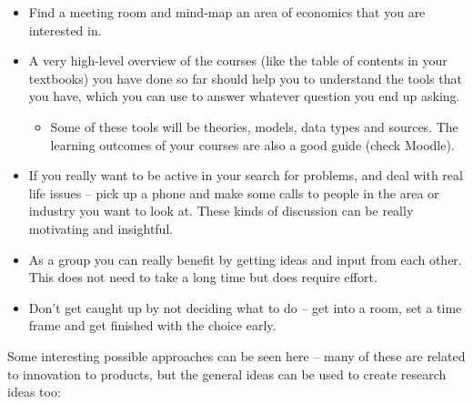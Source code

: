 \documentclass[
]{book}
\providecommand{\tightlist}{%
  \setlength{\itemsep}{0pt}\setlength{\parskip}{0pt}}
\begin{document}
\begin{itemize}
\item
  Find a meeting room and mind-map an area of economics that you are
  interested in.
\item
  A very high-level overview of the courses (like the table of
  contents in your textbooks) you have done so far should help you to
  understand the tools that you have, which you can use to answer
  whatever question you end up asking.

  \begin{itemize}
  \tightlist
  \item
    Some of these tools will be theories, models, data types and
    sources. The learning outcomes of your courses are also a good
    guide (check Moodle).
  \end{itemize}
\item
  If you really want to be active in your search for problems, and
  deal with real life issues -- pick up a phone and make some calls to
  people in the area or industry you want to look at. These kinds of
  discussion can be really motivating and insightful.
\item
  As a group you can really benefit by getting ideas and input from
  each other. This does not need to take a long time but does require
  effort.
\item
  Don't get caught up by not deciding what to do -- get into a room,
  set a time frame and get finished with the choice early.
\end{itemize}

Some interesting possible approaches can be seen here -- many of these
are related to innovation to products, but the general ideas can be used
to create research ideas too:
\end{document}
